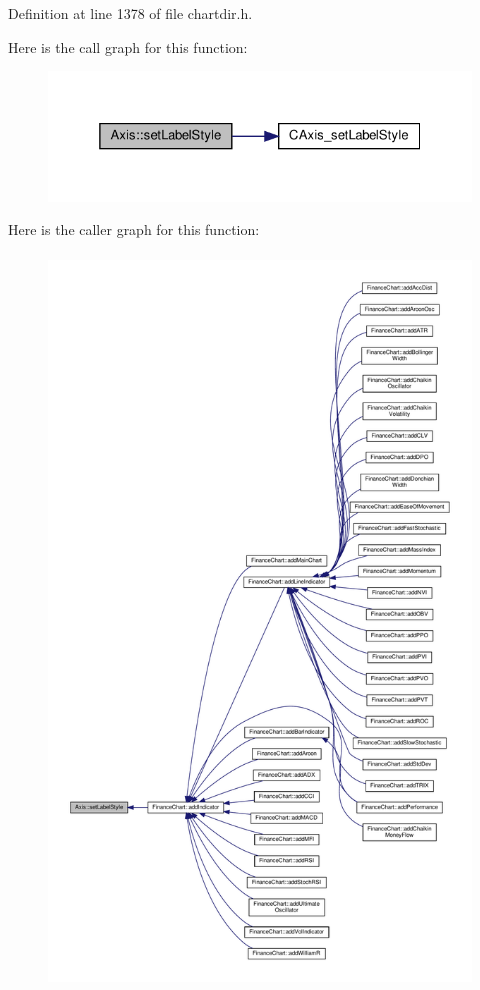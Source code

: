 Definition at line 1378 of file chartdir.\+h.

Here is the call graph for this function\+:
\nopagebreak
\begin{figure}[H]
\begin{center}
\leavevmode
\includegraphics[width=325pt]{class_axis_ab524e166c981420e6de22979fd695bb6_cgraph}
\end{center}
\end{figure}
Here is the caller graph for this function\+:
\nopagebreak
\begin{figure}[H]
\begin{center}
\leavevmode
\includegraphics[height=550pt]{class_axis_ab524e166c981420e6de22979fd695bb6_icgraph}
\end{center}
\end{figure}
\mbox{\label{class_axis_a975e48ae1b4d4d80e86f267f7272fd87}} 

